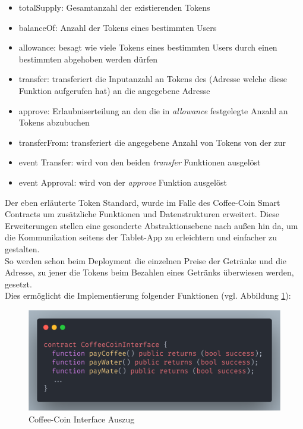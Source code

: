 \begin{itemize}
	\item totalSupply: Gesamtanzahl der existierenden Tokens
	\item balanceOf: Anzahl der Tokens eines bestimmten Users
	\item allowance: besagt wie viele Tokens eines bestimmten Users durch einen bestimmten  abgehoben werden dürfen
	\item transfer: transferiert die Inputanzahl an Tokens des  (Adresse welche diese Funktion aufgerufen hat) an die angegebene Adresse
	\item approve: Erlaubniserteilung an den  die in \textit{allowance} festgelegte Anzahl an Tokens abzubuchen
	\item transferFrom: transferiert die angegebene Anzahl von Tokens von der  zur 
	\item event Transfer: wird von den beiden \textit{transfer} Funktionen ausgelöst
	\item event Approval: wird von der \textit{approve} Funktion ausgelöst
\end{itemize}

Der eben erläuterte Token Standard, wurde im Falle des Coffee-Coin Smart Contracts um zusätzliche Funktionen und Datenstrukturen erweitert. Diese Erweiterungen stellen eine gesonderte Abstraktionsebene nach außen hin da, um die Kommunikation seitens der Tablet-App zu erleichtern und einfacher zu gestalten.\\
So werden schon beim Deployment die einzelnen Preise der Getränke und die Adresse, zu jener die Tokens beim Bezahlen eines Getränks überwiesen werden, gesetzt.\\
Dies ermöglicht die Implementierung folgender Funktionen (vgl. Abbildung \ref{img:cci}): 

\begin{figure}[th!]
	\centering
	\includegraphics[width=.9\columnwidth]{./Abbildungen/Kapitel_03/CCInterface.png}
	\caption{Coffee-Coin Interface Auszug}
	\label{img:cci}
\end{figure}


